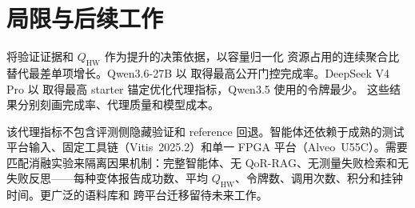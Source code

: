 \section{局限与后续工作}

\VCL{} 将验证证据和 $Q_{\mathrm{HW}}$ 作为提升的决策依据，以容量归一化
资源占用的连续聚合比替代最差单项增长。Qwen3.6-27B 以
\QwenThreeSixSuccessRate{} 取得最高公开门控完成率。DeepSeek V4 Pro 以
\DeepSeekQorProxy{} 取得最高 starter 锚定优化代理指标，Qwen3.5 使用的令牌最少。
这些结果分别刻画完成率、代理质量和模型成本。

该代理指标不包含评测侧隐藏验证和 reference 回退。智能体还依赖于成熟的测试
平台输入、固定工具链（Vitis~2025.2）和单一 FPGA
平台（Alveo~U55C）。需要匹配消融实验来隔离因果机制：完整智能体、无
QoR-RAG、无测量失败检索和无失败反思——每种变体报告成功数、平均
$Q_{\mathrm{HW}}$、令牌数、调用次数、积分和挂钟时间。更广泛的语料库和
跨平台迁移留待未来工作。
